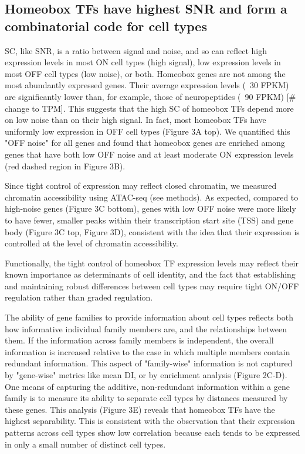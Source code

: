 \subsection{Homeobox TFs have highest SNR and form a combinatorial code for cell types}
SC, like SNR, is a ratio between signal and noise, and so can reflect high expression levels in most ON cell types (high signal), low expression levels in most OFF cell types (low noise), or both. Homeobox genes are not among the most abundantly expressed genes. Their average expression levels (~30 FPKM) are significantly lower than, for example, those of neuropeptides (~90 FPKM) [# change to TPM]. This suggests that the high SC of homeobox TFs depend more on low noise than on their high signal. In fact, most  homeobox TFs have uniformly low expression in OFF cell types (Figure 3A top). We quantified this "OFF noise" for all genes and found that homeobox genes are enriched among genes that have both low OFF noise and at least moderate ON expression levels (red dashed region in Figure 3B).

Since tight control of expression may reflect closed chromatin, we measured chromatin accessibility using ATAC-seq (see methods). As expected, compared to high-noise genes (Figure 3C bottom), genes with low OFF noise were more likely to have fewer, smaller peaks within their transcription start site (TSS) and gene body (Figure 3C top, Figure 3D), consistent with the idea that their expression is controlled at the level of chromatin accessibility.

Functionally, the tight control of homeobox TF expression levels may reflect their known importance as determinants of cell identity, and the fact that establishing and maintaining robust differences between cell types may require tight ON/OFF regulation rather than graded regulation.

The ability of gene families to provide information about cell types reflects both how informative individual family members are, and the relationships between them. If the information across family members is independent, the overall information is increased relative to the case in which multiple members contain redundant information. This aspect of "family-wise" information is not captured by "gene-wise" metrics like mean DI, or by enrichment analysis (Figure 2C-D). One means of capturing the additive, non-redundant information within a gene family is to measure its ability to separate cell types by distances measured by these genes. This analysis (Figure 3E) reveals that homeobox TFs have the highest separability. This is consistent with the observation that their expression patterns across cell types show low correlation because each tends to be expressed in only a small number of distinct cell types. 

